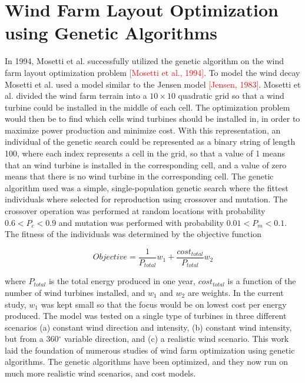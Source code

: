 \documentclass{article}
\begin{document}
\section{Wind Farm Layout Optimization using Genetic Algorithms}

In 1994, Mosetti et al. successfully utilized the genetic algorithm on the wind farm layout optimization problem \textcolor{red}{[Mosetti et al., 1994]}. To model the wind decay Mosetti et al. used a model similar to the Jensen model \textcolor{red}{[Jensen, 1983]}. Mosetti et al. divided the wind farm terrain into a $10\times10$ quadratic grid so that a wind turbine could be installed in the middle of each cell. The optimization problem would then be to find which cells wind turbines should be installed in, in order to maximize power production and minimize cost. With this representation, an individual of the genetic search could be represented as a binary string of length 100, where each index represents a cell in the grid, so that a value of 1 means that an wind turbine is installed in the corresponding cell, and a value of zero means that there is no wind turbine in the corresponding cell. The genetic algorithm used was a simple, single-population genetic search where the fittest individuals where selected for reproduction using crossover and mutation. The crossover operation was performed at random locations with probability $0.6 < P_c < 0.9$ and mutation was performed with probability $0.01 < P_m < 0.1$. The fitness of the individuals was determined by the objective function

\begin{equation}
Objective = \frac{1}{P_{total}}w_1 + \frac{cost_{total}}{P_{total}}w_2
\label{Objective function Mosetti et al.}
\end{equation}

where $P_{total}$ is the total energy produced in one year, $cost_{total}$ is a function of the number of wind turbines installed, and $w_1$ and $w_2$ are weights. In the current study, $w_1$ was kept small so that the focus would be on lowest cost per energy produced. The model was tested on a single type of turbines in three different scenarios (a) constant wind direction and intensity, (b) constant wind intensity, but from a 360$^{\circ}$ variable direction, and (c) a realistic wind scenario. This work laid the foundation of numerous studies of wind farm optimization using genetic algorithms. The genetic algorithms have been optimized, and they now run on much more realistic wind scenarios, and cost models.\\
\end{document}
